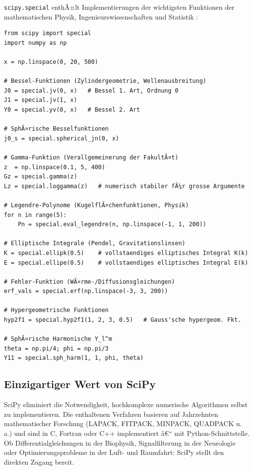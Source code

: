 \documentclass[12pt, a4paper]{article}
\begin{document}
\texttt{scipy.special} enthÃ¤lt Implementierungen der wichtigsten
Funktionen der mathematischen Physik, Ingenieurswissenschaften und
Statistik \cite{abramowitz1972handbook}:

\begin{lstlisting}[caption={Spezielle Funktionen mit SciPy}]
from scipy import special
import numpy as np

x = np.linspace(0, 20, 500)

# Bessel-Funktionen (Zylindergeometrie, Wellenausbreitung)
J0 = special.jv(0, x)   # Bessel 1. Art, Ordnung 0
J1 = special.jv(1, x)
Y0 = special.yv(0, x)   # Bessel 2. Art

# SphÃ¤rische Besselfunktionen
j0_s = special.spherical_jn(0, x)

# Gamma-Funktion (Verallgemeinerung der FakultÃ¤t)
z  = np.linspace(0.1, 5, 400)
Gz = special.gamma(z)
Lz = special.loggamma(z)   # numerisch stabiler fÃ¼r grosse Argumente

# Legendre-Polynome (KugelflÃ¤chenfunktionen, Physik)
for n in range(5):
    Pn = special.eval_legendre(n, np.linspace(-1, 1, 200))

# Elliptische Integrale (Pendel, Gravitationslinsen)
K = special.ellipk(0.5)    # vollstaendiges elliptisches Integral K(k)
E = special.ellipe(0.5)    # vollstaendiges elliptisches Integral E(k)

# Fehler-Funktion (WÃ¤rme-/Diffusionsgleichungen)
erf_vals = special.erf(np.linspace(-3, 3, 200))

# Hypergeometrische Funktionen
hyp2f1 = special.hyp2f1(1, 2, 3, 0.5)   # Gauss'sche hypergeom. Fkt.

# SphÃ¤rische Harmonische Y_l^m
theta = np.pi/4; phi = np.pi/3
Y11 = special.sph_harm(1, 1, phi, theta)
\end{lstlisting}

\subsection{Einzigartiger Wert von SciPy}

SciPy eliminiert die Notwendigkeit, hochkomplexe numerische Algorithmen
selbst zu implementieren. Die enthaltenen Verfahren basieren auf Jahrzehnten
mathematischer Forschung (LAPACK, FITPACK, MINPACK, QUADPACK u.\,a.) und
sind in C, Fortran oder C++ implementiert â€“ mit Python-Schnittstelle.
Ob Differentialgleichungen in der Biophysik, Signalfilterung in der
Neurologie oder Optimierungsprobleme in der Luft- und Raumfahrt:
SciPy stellt den direkten Zugang bereit.
\end{document}
